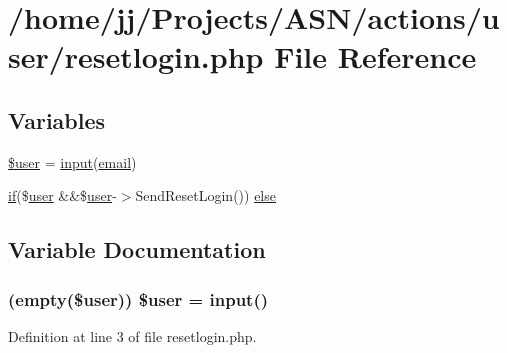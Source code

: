 \hypertarget{actions_2user_2resetlogin_8php}{}\section{/home/jj/\+Projects/\+A\+S\+N/actions/user/resetlogin.php File Reference}
\label{actions_2user_2resetlogin_8php}
\subsection*{Variables}
\begin{DoxyCompactItemize}
\item 
\hyperlink{actions_2user_2resetlogin_8php_a1a4a59dbffac643d9b101b322d73731a}{\$user} = \hyperlink{ossn_8lib_8input_8php_a64ebee98b041c4f75f71ed3cd73cc8ed}{input}(\textquotesingle{}\hyperlink{actions_2account_8php_a011c66ae212438e0d7de7c0e40451bb3}{email}\textquotesingle{})
\item 
\hyperlink{jquery_8tokeninput_8js_ad8dd46a3cbc004569e34401e9e71771a}{if}(\$\hyperlink{ossn_8config_8db_8example_8php_a802544b7ba9f79bbf24ef67773d53bed}{user} \&\&\$\hyperlink{ossn_8config_8db_8example_8php_a802544b7ba9f79bbf24ef67773d53bed}{user}-\/$>$Send\+Reset\+Login()) \hyperlink{actions_2user_2resetlogin_8php_a014c381221281426c442e585cca17fdb}{else}
\end{DoxyCompactItemize}


\subsection{Variable Documentation}
\subsubsection[{\texorpdfstring{\$user}{$user}}]{ (empty(\${\bf user})) \${\bf user} = {\bf input}(\textquotesingle{})}\hypertarget{actions_2user_2resetlogin_8php_a1a4a59dbffac643d9b101b322d73731a}{}\label{actions_2user_2resetlogin_8php_a1a4a59dbffac643d9b101b322d73731a}


Definition at line 3 of file resetlogin.\+php.

